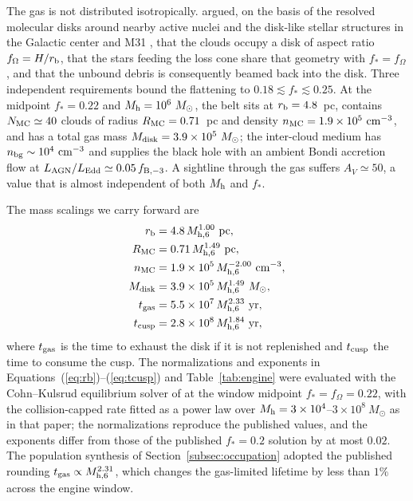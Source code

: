 \documentclass[twocolumn,pdftex]{aastex701}
\newcommand{\msun}{M_{\odot}\xspace}
\newcommand{\mhsix}{M_{\rm h,6}\xspace}
\newcommand{\fom}{f_{\Omega}\xspace}
\newcommand{\rb}{r_{\rm b}\xspace}
\newcommand{\Av}{A_{V}\xspace}
\begin{document}
The gas is not distributed isotropically. \citet{Guillochon:2026a} argued, on the basis of the resolved molecular disks around nearby active nuclei \citep{GarciaBurillo:2016a,Combes:2019a,GarciaBurillo:2021a} and the disk-like stellar structures in the Galactic center and M31 \citep{Levin:2003a,Tremaine:1995a}, that the clouds occupy a disk of aspect ratio $\fom = H/\rb$, that the stars feeding the loss cone share that geometry with $f_{\ast} = \fom$, and that the unbound debris is consequently beamed back into the disk. Three independent requirements bound the flattening to $0.18 \lesssim f_{\ast} \lesssim 0.25$. At the midpoint $f_{\ast} = 0.22$ and $M_{\rm h} = 10^{6}~\msun$, the belt sits at $\rb = 4.8$~pc, contains $N_{\rm MC} \simeq 40$ clouds of radius $R_{\rm MC} = 0.71$~pc and density $n_{\rm MC} = 1.9 \times 10^{5}~{\rm cm}^{-3}$, and has a total gas mass $M_{\rm disk} = 3.9 \times 10^{5}~\msun$; the inter-cloud medium has $n_{\rm bg} \sim 10^{4}~{\rm cm}^{-3}$ and supplies the black hole with an ambient Bondi accretion flow at $L_{\rm AGN}/L_{\rm Edd} \simeq 0.05\, f_{\rm B,-3}$. A sightline through the gas suffers $\Av \simeq 50$, a value that is almost independent of both $M_{\rm h}$ and $f_{\ast}$.

The mass scalings we carry forward are
\begin{align}
\rb &= 4.8\, \mhsix^{1.00}~{\rm pc},\label{eq:rb}\\
R_{\rm MC} &= 0.71\, \mhsix^{1.49}~{\rm pc},\\
n_{\rm MC} &= 1.9 \times 10^{5}\, \mhsix^{-2.00}~{\rm cm}^{-3},\\
M_{\rm disk} &= 3.9 \times 10^{5}\, \mhsix^{1.49}~\msun,\\
t_{\rm gas} &= 5.5 \times 10^{7}\, \mhsix^{2.33}~{\rm yr},\label{eq:tgas}\\
t_{\rm cusp} &= 2.8 \times 10^{8}\, \mhsix^{1.84}~{\rm yr},\label{eq:tcusp}
\end{align}
where $t_{\rm gas}$ is the time to exhaust the disk if it is not replenished and $t_{\rm cusp}$ the time to consume the cusp. The normalizations and exponents in Equations~(\ref{eq:rb})--(\ref{eq:tcusp}) and Table~\ref{tab:engine} were evaluated with the Cohn--Kulsrud equilibrium solver of \citet{Guillochon:2026a} at the window midpoint $f_{\ast} = f_{\Omega} = 0.22$, with the collision-capped rate fitted as a power law over $M_{\rm h} = 3 \times 10^{4}$--$3 \times 10^{8}~\msun$ as in that paper; the normalizations reproduce the published values, and the exponents differ from those of the published $f_{\ast} = 0.2$ solution by at most $0.02$. The population synthesis of Section~\ref{subsec:occupation} adopted the published rounding $t_{\rm gas} \propto \mhsix^{2.31}$, which changes the gas-limited lifetime by less than $1\%$ across the engine window.
\end{document}
